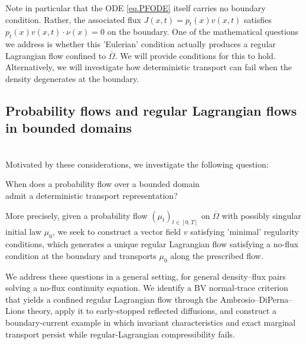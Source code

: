 \documentclass[11pt]{amsart}
\theoremstyle{definition}
\begin{document}
Note in particular that the ODE \eqref{eq.PFODE} itself carries no  boundary condition. Rather, the associated flux $J(x,t)=p_t(x)v(x,t)$ satisfies
$p_t(x)v(x,t)\cdot{}\nu(x)=0$ on the boundary.
One of the mathematical questions we address  is whether this 'Eulerian' condition actually produces a  regular Lagrangian flow confined to $\overline{\Omega}$. We will provide conditions for this to hold.
Alternatively, we will investigate how deterministic transport can fail when the density degenerates at the boundary.

\subsection{Probability flows and regular Lagrangian flows in bounded domains}\ \\


Motivated by these considerations, we investigate the following question:\\
\begin{center}
When does a probability flow over a bounded domain \\admit a deterministic transport representation?    
\end{center}
More precisely, given a probability flow $(\mu_t)_{t\in[0,T]}$ on $\overline{\Omega}$ with possibly singular initial law $\mu_0$,
 we seek to construct a vector field $v$ satisfying 'minimal' regularity  conditions, which
generates a unique regular Lagrangian flow  satisfying a no-flux condition at the boundary and transports $\mu_0$ along the prescribed flow. 


We address these questions in a  general setting, for general density--flux pairs solving a no-flux continuity equation. We identify a BV normal-trace criterion that yields a confined regular Lagrangian flow through the Ambrosio--DiPerna--Lions theory, apply it to early-stopped reflected diffusions, and construct a boundary-current example in which invariant characteristics and exact marginal transport persist while regular-Lagrangian compressibility fails.
\end{document}
